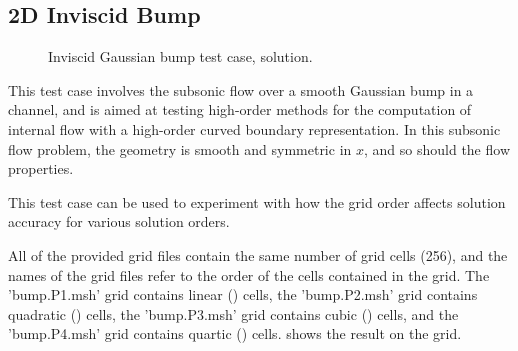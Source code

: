 \subsection{2D Inviscid Bump}
\label{SEC:Testcases:Bump}

\begin{figure}[h!tb]
  \begin{center}
    \caption[Inviscid Gaussian bump test case.]%
            {Inviscid Gaussian bump test case, \PO[3] solution.}
    \label{FIG:Bump}
  \end{center}
\end{figure}

This test case involves the subsonic flow over a smooth Gaussian bump in a
channel, and is aimed at testing high-order methods for the computation of
internal flow with a high-order curved boundary representation.
%
In this subsonic flow problem, the geometry is smooth and symmetric in $x$,
and so should the flow properties.

This test case can be used to experiment with how the grid order affects
solution accuracy for various solution orders.

All of the provided grid files contain the same number of grid cells (256),
and the names of the grid files refer to the order of the cells contained
in the grid.
%
The 'bump.P1.msh' grid contains linear    (\PO[1]) cells,
the 'bump.P2.msh' grid contains quadratic (\PO[2]) cells,
the 'bump.P3.msh' grid contains cubic     (\PO[3]) cells, and
the 'bump.P4.msh' grid contains quartic   (\PO[4]) cells.
%
%
 shows the result on the \PO[3] grid.


